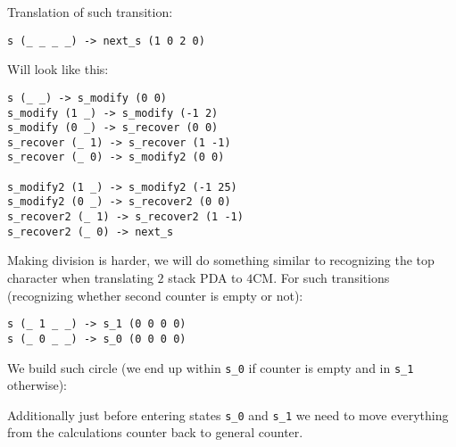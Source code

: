 \documentclass[english,shortabstract,mgr]{iithesis}
\begin{document}
Translation of such transition:
\begin{verbatim}
s (_ _ _ _) -> next_s (1 0 2 0)
\end{verbatim}

Will look like this:
\begin{verbatim}
s (_ _) -> s_modify (0 0)
s_modify (1 _) -> s_modify (-1 2)
s_modify (0 _) -> s_recover (0 0)
s_recover (_ 1) -> s_recover (1 -1)
s_recover (_ 0) -> s_modify2 (0 0)

s_modify2 (1 _) -> s_modify2 (-1 25)
s_modify2 (0 _) -> s_recover2 (0 0)
s_recover2 (_ 1) -> s_recover2 (1 -1)
s_recover2 (_ 0) -> next_s
\end{verbatim}


Making division is harder, we will do something similar to recognizing the top
character when translating $2$ stack PDA to $4$CM. For such transitions (recognizing
whether second counter is empty or not):
\begin{verbatim}
s (_ 1 _ _) -> s_1 (0 0 0 0)
s (_ 0 _ _) -> s_0 (0 0 0 0)
\end{verbatim}

We build such circle (we end up within \texttt{s\_0} if counter is empty and in \texttt{s\_1} otherwise):

\begin{center}
\end{center}

Additionally just before entering states \texttt{s\_0} and \texttt{s\_1}
we need to move everything from the calculations counter back to general counter.
\end{document}
